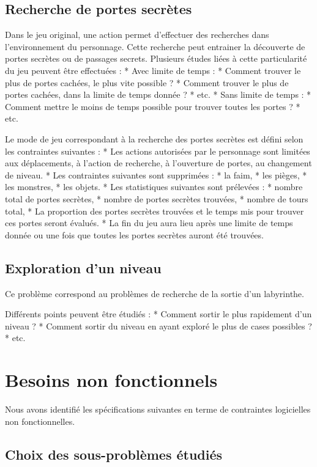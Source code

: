 \documentclass[12pt]{article}
\begin{document}
\subsection{Recherche de portes secrètes}

Dans le jeu original, une action permet d'effectuer des recherches dans
l'environnement du personnage. Cette recherche peut entrainer la
découverte de portes secrètes ou de passages secrets. Plusieurs études
liées à cette particularité du jeu peuvent être effectuées : * Avec
limite de temps : * Comment trouver le plus de portes cachées, le plus
vite possible ? * Comment trouver le plus de portes cachées, dans la
limite de temps donnée ? * etc. * Sans limite de temps : * Comment
mettre le moins de temps possible pour trouver toutes les portes ? *
etc.

Le mode de jeu correspondant à la recherche des portes secrètes est
défini selon les contraintes suivantes : * Les actions autorisées par le
personnage sont limitées aux déplacements, à l'action de recherche, à
l'ouverture de portes, au changement de niveau. * Les contraintes
suivantes sont supprimées : * la faim, * les pièges, * les monstres, *
les objets. * Les statistiques suivantes sont prélevées : * nombre total
de portes secrètes, * nombre de portes secrètes trouvées, * nombre de
tours total, * La proportion des portes secrètes trouvées et le temps
mis pour trouver ces portes seront évalués. * La fin du jeu aura lieu
après une limite de temps donnée ou une fois que toutes les portes
secrètes auront été trouvées.

\subsection{Exploration d'un niveau}

Ce problème correspond au problèmes de recherche de la sortie d'un
labyrinthe.

Différents points peuvent être étudiés : * Comment sortir le plus
rapidement d'un niveau ? * Comment sortir du niveau en ayant exploré le
plus de cases possibles ? * etc.

\section{Besoins non fonctionnels}

Nous avons identifié les spécifications suivantes en terme de
contraintes logicielles non fonctionnelles.

\subsection{Choix des sous-problèmes étudiés}
\end{document}
